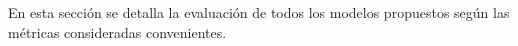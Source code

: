 En esta sección se detalla la evaluación de todos los modelos propuestos según las métricas consideradas convenientes.